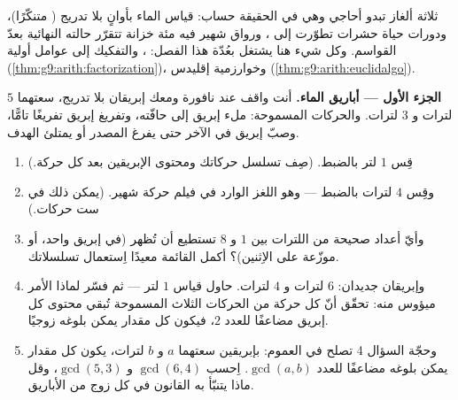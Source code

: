 \begin{problem}
\label{pb:g9:arith:1}
ثلاثة ألغاز تبدو أحاجي وهي في الحقيقة حساب: قياس الماء بأوانٍ
بلا تدريج ( متنكّرًا)، ودورات حياة حشرات
تطوّرت إلى ، ورواق شهير فيه مئة خزانة تتقرّر
حالته النهائية بعدّ القواسم. وكل شيء هنا يشتغل بعُدّة هذا
الفصل: ، والتفكيك إلى عوامل أولية
(\cref{thm:g9:arith:factorization})، وخوارزمية إقليدس
(\cref{thm:g9:arith:euclidalgo}).

\medskip
\noindent\textbf{الجزء الأول --- أباريق الماء.}
أنت واقف عند نافورة ومعك إبريقان بلا تدريج، سعتهما $5$ لترات
و $3$ لترات. والحركات المسموحة: ملء إبريق إلى حافّته، وتفريغ
إبريق تفريغًا تامًّا، وصبّ إبريق في الآخر حتى يفرغ المصدر أو
يمتلئ الهدف.
\begin{enumerate}
  \item قِس $1$ لتر بالضبط. (صِف تسلسل حركاتك ومحتوى الإبريقين
        بعد كل حركة.)
  \item وقِس $4$ لترات بالضبط --- وهو اللغز الوارد في فيلم حركة
        شهير. (يمكن ذلك في ست حركات.)
  \item وأيّ أعداد صحيحة من اللترات بين $1$ و $8$ تستطيع أن
        تُظهر (في إبريق واحد، أو موزّعة على الاِثنين)؟ أكمل
        القائمة معيدًا اِستعمال تسلسلاتك.
  \item وإبريقان جديدان: $6$ لترات و $4$ لترات. حاول قياس $1$
        لتر --- ثم فسّر لماذا الأمر ميؤوس منه: تحقّق أنّ كل حركة
        من الحركات الثلاث المسموحة تُبقي محتوى كل إبريق
        مضاعفًا للعدد $2$، فيكون كل مقدار يمكن بلوغه زوجيًا.
  \item وحجّة السؤال 4 تصلح في العموم: بإبريقين سعتهما $a$ و $b$
        لترات، يكون كل مقدار يمكن بلوغه مضاعفًا للعدد
        $\gcd(a, b)$. اِحسب $\gcd(6, 4)$ و $\gcd(5, 3)$، وقل ماذا
        يتنبّأ به القانون في كل زوج من الأباريق.
\end{enumerate}


\end{problem}
